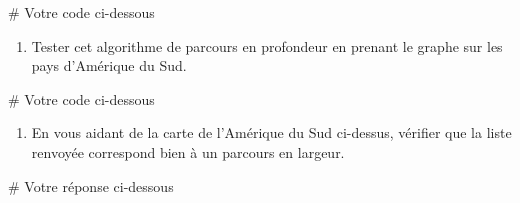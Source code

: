 \documentclass[
  a4paper,
  DIV=11,
  numbers=noendperiod]{scrartcl}
\newenvironment{Shaded}{\begin{snugshade}}{\end{snugshade}}
\newcommand{\CommentTok}[1]{\textcolor[rgb]{0.37,0.37,0.37}{#1}}
\providecommand{\tightlist}{%
  \setlength{\itemsep}{0pt}\setlength{\parskip}{0pt}}\usepackage{longtable,booktabs,array}
\begin{document}
\begin{Shaded}
\begin{Highlighting}[]
\CommentTok{\# Votre code ci{-}dessous}
\end{Highlighting}
\end{Shaded}

\begin{enumerate}
\def\labelenumi{\arabic{enumi}.}
\setcounter{enumi}{1}
\tightlist
\item
  Tester cet algorithme de parcours en profondeur en prenant le graphe
  sur les pays d'Amérique du Sud.
\end{enumerate}

\begin{Shaded}
\begin{Highlighting}[]
\CommentTok{\# Votre code ci{-}dessous}
\end{Highlighting}
\end{Shaded}

\begin{enumerate}
\def\labelenumi{\arabic{enumi}.}
\setcounter{enumi}{2}
\tightlist
\item
  En vous aidant de la carte de l'Amérique du Sud ci-dessus, vérifier
  que la liste renvoyée correspond bien à un parcours en largeur.
\end{enumerate}

\begin{Shaded}
\begin{Highlighting}[]
\CommentTok{\# Votre réponse ci{-}dessous}
\end{Highlighting}
\end{Shaded}
\end{document}
